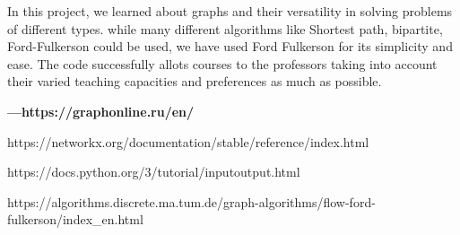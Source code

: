 \documentclass{article} %
\begin{document}
\noindent \textbf{}

\noindent \textbf{}

\noindent In this project, we learned about graphs and their versatility in solving problems of different types. while many different algorithms like Shortest path, bipartite, Ford-Fulkerson could be used, we have used Ford Fulkerson for its simplicity and ease. The code successfully allots courses to the professors taking into account their varied teaching capacities and preferences as much as possible.

\noindent \textbf{}

\noindent \textbf{}

\noindent \textbf{---https://graphonline.ru/en/}

\noindent https://networkx.org/documentation/stable/reference/index.html\textbf{}

\noindent https://docs.python.org/3/tutorial/inputoutput.html\textbf{}

\noindent https://algorithms.discrete.ma.tum.de/graph-algorithms/flow-ford-fulkerson/index\_en.html\textbf{}

\noindent 
\end{document}

